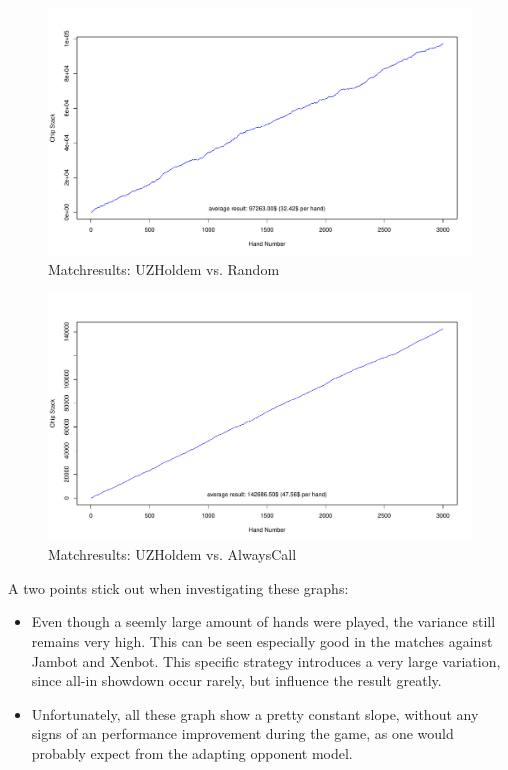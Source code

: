 \begin{figure}[!ht]
\centering
\includegraphics[width=\linewidth]{section06-implementation/figures/matchresults/Random1}
\caption{Matchresults: UZHoldem vs. Random}
\label{fig:result-random}
\end{figure}

\begin{figure}[!ht]
\centering
\includegraphics[width=\linewidth]{section06-implementation/figures/matchresults/AlwaysCall}
\caption{Matchresults: UZHoldem vs. AlwaysCall}
\label{fig:result-alwayscall}
\end{figure}



A two points stick out when investigating these graphs:

\begin{itemize}
	\item Even though a seemly large amount of hands were played, the variance still remains very high. This can be seen especially good in the matches against Jambot and Xenbot. This specific strategy introduces a very large variation, since all-in showdown occur rarely, but influence the result greatly.
	\item Unfortunately, all these graph show a pretty constant slope, without any signs of an performance improvement during the game, as one would probably expect from the adapting opponent model. 
\end{itemize}

